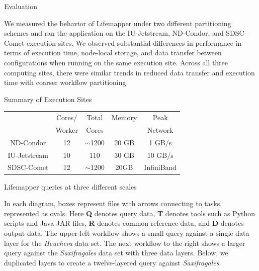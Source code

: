 \documentclass{beamer}
\newcommand{\lm}{Lifemapper\xspace}
\newcommand{\condor}{ND-Condor\xspace}
\newcommand{\jetstream}{IU-Jetstream\xspace}
\newcommand{\comet}{SDSC-Comet\xspace}
\begin{document}
\begin{frame}[fragile]
\begin{minipage}[t][0.97\textheight]{0.65\textwidth}
\begin{minipage}[t][0.86\textheight]{0.48\textwidth}
\begin{alertblock}{Evaluation\rule{0pt}{2.1ex}}
{\vspace{32pt}

We measured the behavior of \lm under two different partitioning schemes and ran the application on the \jetstream, \condor, and \comet{} execution sites.
We observed substantial differences in performance in terms of execution time, node-local storage, and data transfer between configurations when running on the same execution site.
Across all three computing sites,
there were similar trends in reduced data transfer and execution time with coarser workflow partitioning.}
\end{alertblock}

\vfill

\begin{alertblock}{Summary of Execution Sites\rule{0pt}{2.1ex}}
\vspace*{16pt}
\begin{center}
\begin{tabular}{|c|c c c c|}
\hline
           & Cores/ & Total  & Memory & Peak \rule{0pt}{2.1ex} \\
           & Worker & Cores  &        & Network \\ \hline
\condor    & 12     & $\sim$1200 & 20 GB  & 1 GB/s \rule{0pt}{2.1ex} \\
\jetstream &  10    & 110    & 30 GB  & 10 GB/s \\
\comet     & 12     & $\sim$1200 & 20GB   & InfiniBand \\
\hline
\end{tabular}
\end{center}
\end{alertblock}

\vfill

\begin{alertblock}{\lm queries at three different scales\rule{0pt}{2.1ex}}
\vspace*{16pt}
\parbox{\linewidth}{In each diagram,
boxes represent files with arrows connecting to tasks,
represented as ovals.
Here \textbf{Q} denotes query data,
\textbf{T} denotes tools such as Python scripts and Java JAR files,
\textbf{R} denotes common reference data,
and \textbf{D} denotes output data.
The upper left workflow shows a small query against a single data layer for the \textit{Heuchera} data set.
The next workflow to the right shows a larger query against the \textit{Saxifragales} data set with three data layers.
Below, we duplicated layers to create a twelve-layered query against \textit{Saxifragales}.}


\end{alertblock}
\end{minipage}
\end{minipage}
\end{frame}
\end{document}
